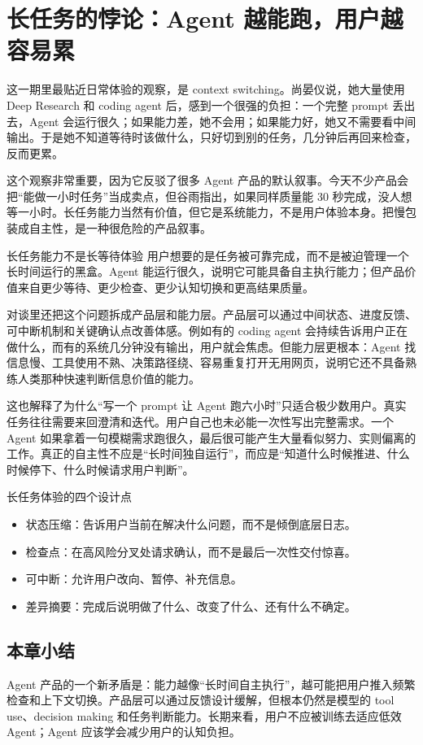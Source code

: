 \section{长任务的悖论：Agent 越能跑，用户越容易累}

这一期里最贴近日常体验的观察，是 context switching。尚晏仪说，她大量使用 Deep Research 和 coding agent 后，感到一个很强的负担：一个完整 prompt 丢出去，Agent 会运行很久；如果能力差，她不会用；如果能力好，她又不需要看中间输出。于是她不知道等待时该做什么，只好切到别的任务，几分钟后再回来检查，反而更累。

这个观察非常重要，因为它反驳了很多 Agent 产品的默认叙事。今天不少产品会把“能做一小时任务”当成卖点，但谷雨指出，如果同样质量能 30 秒完成，没人想等一小时。长任务能力当然有价值，但它是系统能力，不是用户体验本身。把慢包装成自主性，是一种很危险的产品叙事。

\begin{importantbox}{长任务能力不是长等待体验}
用户想要的是任务被可靠完成，而不是被迫管理一个长时间运行的黑盒。Agent 能运行很久，说明它可能具备自主执行能力；但产品价值来自更少等待、更少检查、更少认知切换和更高结果质量。
\end{importantbox}

对谈里还把这个问题拆成产品层和能力层。产品层可以通过中间状态、进度反馈、可中断机制和关键确认点改善体感。例如有的 coding agent 会持续告诉用户正在做什么，而有的系统几分钟没有输出，用户就会焦虑。但能力层更根本：Agent 找信息慢、工具使用不熟、决策路径绕、容易重复打开无用网页，说明它还不具备熟练人类那种快速判断信息价值的能力。

这也解释了为什么“写一个 prompt 让 Agent 跑六小时”只适合极少数用户。真实任务往往需要来回澄清和迭代。用户自己也未必能一次性写出完整需求。一个 Agent 如果拿着一句模糊需求跑很久，最后很可能产生大量看似努力、实则偏离的工作。真正的自主性不应是“长时间独自运行”，而应是“知道什么时候推进、什么时候停下、什么时候请求用户判断”。

\begin{knowledgebox}{长任务体验的四个设计点}
\begin{itemize}
  \item 状态压缩：告诉用户当前在解决什么问题，而不是倾倒底层日志。
  \item 检查点：在高风险分叉处请求确认，而不是最后一次性交付惊喜。
  \item 可中断：允许用户改向、暂停、补充信息。
  \item 差异摘要：完成后说明做了什么、改变了什么、还有什么不确定。
\end{itemize}
\end{knowledgebox}

\subsection{本章小结}

Agent 产品的一个新矛盾是：能力越像“长时间自主执行”，越可能把用户推入频繁检查和上下文切换。产品层可以通过反馈设计缓解，但根本仍然是模型的 tool use、decision making 和任务判断能力。长期来看，用户不应被训练去适应低效 Agent；Agent 应该学会减少用户的认知负担。

